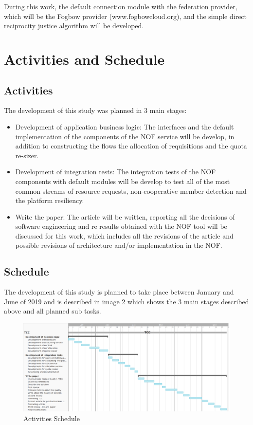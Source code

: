\documentclass{article}
\begin{document}
During this work, the default connection module with the federation provider, which will be the Fogbow provider (www.fogbowcloud.org), and the simple direct reciprocity justice algorithm will be developed.

\section{Activities and Schedule}

\subsection{Activities}
The development of this study was planned in 3 main stages:

\begin{itemize}
    \item Development of application business logic: 
	The interfaces and the default implementation of the components of the NOF service will be develop, in addition to constructing the flows the allocation of requisitions and the quota re-sizer.
	\item Development of integration tests:
	The integration tests of the NOF components with default modules will be develop to test all of the most common streams of resource requests, non-cooperative member detection and the platform resiliency.
	\item Write the paper:
	The article will be written, reporting all the decisions of software engineering and re results obtained with the NOF tool will be discussed for this work, which includes all the revisions of the article and possible revisions of architecture and/or implementation in the NOF.
\end{itemize}
    
\subsection{Schedule}

The development of this study is planned to take place between January and June of 2019 and is described in image 2 which shows the 3 main stages described above and all planned sub tasks.

\begin{figure}[h!]
    \centering
    \includegraphics[scale=0.35]{./image/TCC-schedule.png}
    \caption{Activities Schedule}
\end{figure}
\end{document}
